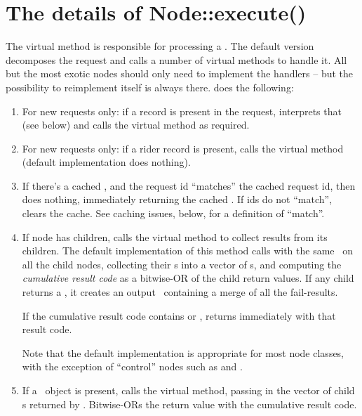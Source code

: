\documentclass[10pt]{article}
\begin{document}
\section{The details of Node::execute()}

  The virtual  method is responsible for processing a
  \Request. The default version decomposes the request and calls a number of
  virtual methods to handle it. All but the most exotic nodes should only need
  to implement the handlers -- but the possibility to reimplement
   itself is always there.  does the
  following:

  \begin{enumerate}
  
  \item For new requests only: if a  record is present in the request, interprets that
    (see below) and calls the virtual  method as required. 

  \item For new requests only: if a rider record is present, calls the virtual
     method (default implementation does nothing).
    
  \item If there's a cached \Result, and the request id ``matches'' the cached
    request id, then does nothing, immediately returning the cached \Result. 
    If ids do not ``match'', clears the cache. See caching issues, below,
    for a definition of ``match''.

  \item If node has children, calls the virtual  method to
    collect results from its children. The default implementation of this
    method calls  with the same \Request\ on all the child nodes,
    collecting their \Result{}s into a vector of s, and
    computing the {\em cumulative result code} as a bitwise-OR of the child
    return values. If any child returns a , it creates an output
    \Result\ containing a merge of all the fail-results.

    If the cumulative result code contains  or ,
     returns immediately with that result code. 
    
    Note that the default implementation is appropriate for most node classes,
    with the exception of ``control'' nodes such as  and .

  \item If a \Cells\ object is present, calls the virtual 
    method, passing in the vector of child \Result{}s returned by
    . Bitwise-ORs the return value with the cumulative
    result code.


\end{enumerate}
\end{document}
